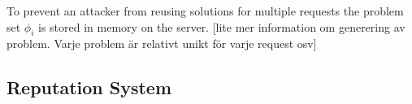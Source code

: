 To prevent an attacker from reusing solutions for multiple requests the problem set $\phi_i$ is stored in memory on the server.
[lite mer information om generering av problem. Varje problem är relativt unikt för varje request osv]

\subsection{Reputation System}

